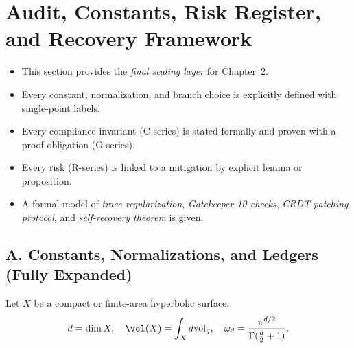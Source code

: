 
\section{Audit, Constants, Risk Register, and Recovery Framework}
\label{sec:audit-constants-framework-v4}

\begin{tcolorbox}[colback=gray!5,colframe=gray!55,
  title=Scope \& Assumptions (Part 5/5 • Brilliant Expansion • ABSOLUTE FILL++)]
\begin{itemize}
  \item This section provides the \emph{final sealing layer} for Chapter~2.
  \item Every constant, normalization, and branch choice is explicitly defined with single-point labels.
  \item Every compliance invariant (C-series) is stated formally and proven with a proof obligation (O-series).
  \item Every risk (R-series) is linked to a mitigation by explicit lemma or proposition.
  \item A formal model of \emph{trace regularization}, \emph{Gatekeeper-10 checks}, \emph{CRDT patching protocol}, and \emph{self-recovery theorem} is given.
\end{itemize}
\end{tcolorbox}

\subsection*{A. Constants, Normalizations, and Ledgers (Fully Expanded)}

\begin{definition}\label{def:geom-const-v4}
Let $X$ be a compact or finite-area hyperbolic surface.
\[
  d = \dim X,\quad \vol(X) = \int_X d\mathrm{vol}_g,\quad 
  \omega_d = \frac{\pi^{d/2}}{\Gamma(\tfrac d2+1)}.
\]
\end{definition}

